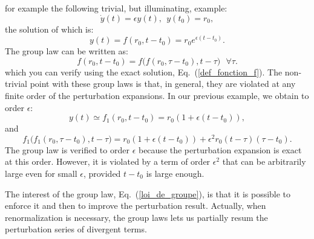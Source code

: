 \documentclass[floatfix,twocolumn,preprintnumbers,amsmath,amssymb,prb]{revtex4}
\begin{document}
for example the following trivial, but illuminating, example:
\begin{equation}
\dot{y}(t)=\epsilon y(t),\ \ y(t_0)=r_0,
\label{trivial_equa_diff}
\end{equation}
the solution of which is:
\begin{equation}
y(t)=f(r_0,t-t_0)=r_0 e^{\epsilon(t-t_0)}.
\label{def_fonction_f}
\end{equation}
The group law can be written as\cite{foot9}:
\begin{equation}
f(r_0,t-t_0)= f\big(f(r_0,\tau-t_0),t-\tau\big)\ \ \ \forall \tau.
\label{loi_de_groupe}
\end{equation}
which you can verify using the exact solution,
Eq.~(\ref{def_fonction_f}). The non-trivial point with these group
laws is that, in general, they are violated at any finite order of
the perturbation expansions. In our previous example, we obtain to
order $\epsilon$:
\begin{equation}
y(t)\simeq f_1(r_0,t-t_0)=r_0 (1+\epsilon(t-t_0)),
\label{equa_diff_premier_ordre}
\end{equation}
and 
\begin{equation}
f_1\big(f_1(r_0,\tau-t_0),t-\tau\big)=
r_0 (1+\epsilon(t-t_0))+\epsilon^2 r_0
(t-\tau)(\tau-t_0).
\label{loi_groupe_approchee}
\end{equation}
The group law is verified to order $\epsilon$ because the
perturbation expansion is exact at this order. However, it is
violated by a term of order $\epsilon^2$ that can be arbitrarily
large even for small $\epsilon$, provided $t-t_0$ is large enough.

The interest of the group law, Eq.~(\ref{loi_de_groupe}), is that
it is possible to enforce it and then to improve the perturbation
result. Actually, when renormalization is necessary, the group
laws lets us partially resum the perturbation series of divergent
terms.
\end{document}
